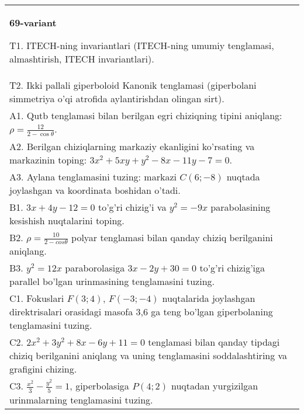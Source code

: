 \documentclass{article}
\begin{document}
\begin{tabular}{m{17cm}}
\textbf{69-variant}
\newline

T1. ITECH-ning invariantlari (ITECH-ning umumiy tenglamasi, almashtirish, ITECH invariantlari).\\

T2. Ikki pallali giperboloid Kanonik tenglamasi (giperbolani simmetriya o'qi atrofida aylantirishdan olingan sirt).\\

A1. Qutb tenglamasi bilan berilgan egri chiziqning tipini aniqlang: $\rho=\frac{12}{2-\cos\theta}$.\\

A2. Berilgan chiziqlarning markaziy ekanligini ko'rsating va markazinin toping: $3x^{2}+5xy+y^{2}-8x-11y-7=0$.\\

A3. Aylana tenglamasini tuzing: markazi $C(6;-8)$ nuqtada joylashgan va koordinata boshidan o'tadi.\\

B1. $3x + 4y - 12 = 0$ to'g'ri chizig'i va $y^{2} = - 9x$ parabolasining kesishish nuqtalarini toping.\\

B2. $\rho = \frac{10}{2 - cos\theta}$ polyar tenglamasi bilan qanday chiziq berilganini aniqlang.  \\

B3. $y^{2} = 12x$ paraborolasiga $3x - 2y + 30 = 0$ to'g'ri chizig'iga parallel bo'lgan urinmasining tenglamasini tuzing.  \\

C1. Fokuslari $F(3;4)$, $F(-3;-4)$ nuqtalarida joylashgan direktrisalari orasidagi masofa 3,6 ga teng bo'lgan giperbolaning tenglamasini tuzing.  \\

C2. $2x^{2} + 3y^{2} + 8x - 6y + 11 = 0$ tenglamasi bilan qanday tipdagi chiziq berilganini aniqlang va uning tenglamasini soddalashtiring va grafigini chizing.  \\

C3. $\frac{x^{2}}{3} - \frac{y^{2}}{5} = 1$, giperbolasiga $P(4;2)$ nuqtadan yurgizilgan urinmalarning tenglamasini tuzing.  \\

\end{tabular}
\vspace{1cm}
\end{document}
